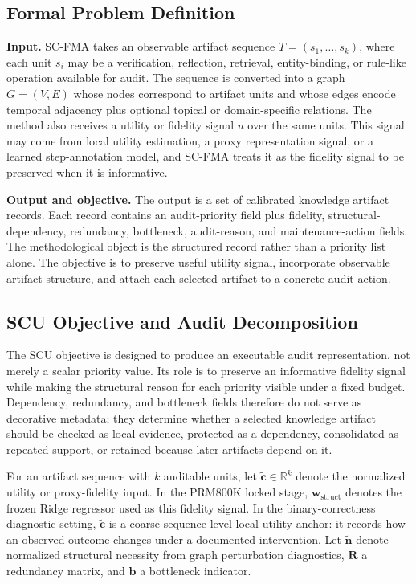 \documentclass[a4paper,fleqn]{cas-sc}
\newcommand{\wstruct}{\ensuremath{\mathbf{w}_{\mathrm{struct}}}}
\begin{document}
\subsection{Formal Problem Definition}

\textbf{Input.} SC-FMA takes an observable artifact sequence $T=(s_1,\ldots,s_k)$, where each unit $s_i$ may be a verification, reflection, retrieval, entity-binding, or rule-like operation available for audit. The sequence is converted into a graph $G=(V,E)$ whose nodes correspond to artifact units and whose edges encode temporal adjacency plus optional topical or domain-specific relations. The method also receives a utility or fidelity signal $u$ over the same units. This signal may come from local utility estimation, a proxy representation signal, or a learned step-annotation model, and SC-FMA treats it as the fidelity signal to be preserved when it is informative.

\textbf{Output and objective.} The output is a set of calibrated knowledge artifact records. Each record contains an audit-priority field plus fidelity, structural-dependency, redundancy, bottleneck, audit-reason, and maintenance-action fields. The methodological object is the structured record rather than a priority list alone. The objective is to preserve useful utility signal, incorporate observable artifact structure, and attach each selected artifact to a concrete audit action.

\subsection{SCU Objective and Audit Decomposition}
\label{sec:scu-objective}

The SCU objective is designed to produce an executable audit representation, not merely a scalar priority value. Its role is to preserve an informative fidelity signal while making the structural reason for each priority visible under a fixed budget. Dependency, redundancy, and bottleneck fields therefore do not serve as decorative metadata; they determine whether a selected knowledge artifact should be checked as local evidence, protected as a dependency, consolidated as repeated support, or retained because later artifacts depend on it.

For an artifact sequence with $k$ auditable units, let $\tilde{\mathbf{c}}\in\mathbb{R}^k$ denote the normalized utility or proxy-fidelity input. In the PRM800K locked stage, \wstruct{} denotes the frozen Ridge regressor used as this fidelity signal. In the binary-correctness diagnostic setting, $\tilde{\mathbf{c}}$ is a coarse sequence-level local utility anchor: it records how an observed outcome changes under a documented intervention. Let $\tilde{\mathbf{n}}$ denote normalized structural necessity from graph perturbation diagnostics, $\mathbf{R}$ a redundancy matrix, and $\mathbf{b}$ a bottleneck indicator.
\end{document}
